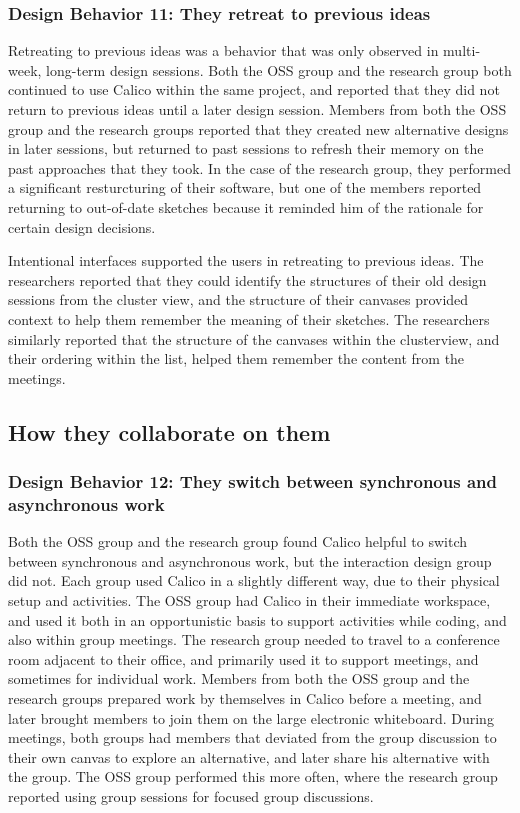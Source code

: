 \subsubsection{Design Behavior 11: They retreat to previous ideas}

Retreating to previous ideas was a behavior that was only observed in multi-week, long-term design sessions. Both the OSS group and the research group both continued to use Calico within the same project, and reported that they did not return to previous ideas until a later design session. Members from both the OSS group and the research groups reported that they created new alternative designs in later sessions, but returned to past sessions to refresh their memory on the past approaches that they took. In the case of the research group, they performed a significant resturcturing of their software, but one of the members reported returning to out-of-date sketches because it reminded him of the rationale for certain design decisions.

Intentional interfaces supported the users in retreating to previous ideas. The researchers reported that they could identify the structures of their old design sessions from the cluster view, and the structure of their canvases provided context to help them remember the meaning of their sketches. The researchers similarly reported that the structure of the canvases within the clusterview, and their ordering within the list, helped them remember the content from the meetings. 

\subsection{How they collaborate on them}

\subsubsection{Design Behavior 12: They switch between synchronous and asynchronous work}

Both the OSS group and the research group found Calico helpful to switch between synchronous and asynchronous work, but the interaction design group did not. Each group used Calico in a slightly different way, due to their physical setup and activities. The OSS group had Calico in their immediate workspace, and used it both in an opportunistic basis to support activities while coding, and also within group meetings. The research group needed to travel to a conference room adjacent to their office, and primarily used it to support meetings, and sometimes for individual work. Members from both the OSS group and the research groups prepared work by themselves in Calico before a meeting, and later brought members to join them on the large electronic whiteboard. During meetings, both groups had members that deviated from the group discussion to their own canvas to explore an alternative, and later share his alternative with the group. The OSS group performed this more often, where the research group reported using group sessions for focused group discussions.

